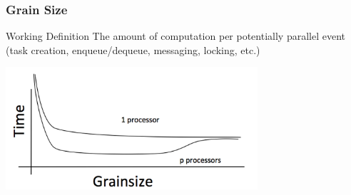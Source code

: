 \begin{frame}
\frametitle{Grain Size}
  \begin{block}{Working Definition} The amount of computation per potentially
      parallel event (task creation, enqueue/dequeue, messaging,
      locking, etc.)
  \end{block}
  \begin{center} \includegraphics[width=0.7\textwidth]{../figures/grain1.png} \end{center}
\end{frame}

